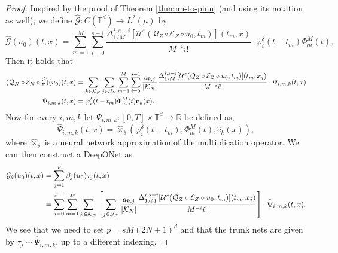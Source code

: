 \documentclass{article}
\numberwithin{equation}{section}
\newcommand{\fb}{\bm{\mathrm{e}}}
\newcommand{\T}{\mathbb{T}}
\newcommand{\R}{\mathbb{R}}
\newcommand{\cE}{\mathcal{E}}
\newcommand{\cG}{\mathcal{G}}
\newcommand{\cJ}{\mathcal{J}}
\newcommand{\cK}{\mathcal{K}}
\newcommand{\cQ}{\mathcal{Q}}
\newcommand{\cU}{\mathcal{U}}
\renewcommand{\epsilon}{\varepsilon}
\newcommand{\1}{\mathbbm{1}}
\newcommand{\Psihat}{\widehat{\Psi}}
\newcommand{\hattimes}{\widehat{\times}}
\newcommand{\cGhat}{{\widehat{\cG}}}
\begin{document}
\begin{proof}
Inspired by the proof of Theorem \ref{thm:nn-to-pinn} (and using its notation as well), we define $\cGhat: C(\T^d)\to L^2(\mu)$ by
\begin{equation}
    \cGhat(u_0)(t,x) =  \sum_{m=1}^M\sum_{i=0}^{s-1}  \frac{\Delta^{i,s-i}_{1/M}[\cU^\epsilon(\cQ_Z\circ\cE_Z\circ u_0, t_m)](t_m,x)}{M^{-i} i!}\cdot \varphi_i^\delta(t-t_m)   \Phi^M_m(t), 
\end{equation}
Then it holds that
\begin{equation}
\begin{split}
    (\cQ_N\circ\cE_N\circ\cGhat)(u_0)(t,x) &=  \sum_{k\in \cK_N} \sum_{j\in \cJ_N}  \sum_{m=1}^M\sum_{i=0}^{s-1} \frac{a_{k,j}}{\abs{\cK_N}} \frac{\Delta^{i,s-i}_{1/M}[\cU^\epsilon(\cQ_Z\circ\cE_Z\circ u_0, t_m)](t_m,x_j)}{M^{-i} i!}\cdot \Psi_{i,m,k}(t,x)\\
    \Psi_{i,m,k}(t,x) &= \varphi_i^\delta(t-t_m)   \Phi^M_m(t)  \fb_k(x).
\end{split}
\end{equation}
Now for every $i, m, k$ let $\Psi_{i,m,k}:[0,T]\times \T^d\to \R$ be defined as, 
\begin{equation}
    \Psihat_{i,m,k}(t,x) = \hattimes_\delta\left(\varphi_i^\delta(t-t_m),\Phi^M_m(t),\widehat{\fb}
    _k(x)\right), 
\end{equation}
where $\hattimes_\delta$ is a neural network approximation of the multiplication operator. We can then construct a DeepONet as
\begin{equation}\label{eq:def-pido}
    \begin{split}
 \cG_\theta(u_0)(t,x) &= \sum_{j=1}^p \beta_j(u_0)\tau_j(t,x)\\
 &= \sum_{i=0}^{s-1}\sum_{m=1}^M \sum_{k\in \cK_N} \left[\sum_{j\in \cJ_N}   \frac{a_{k,j}}{\abs{\cK_N}} \frac{\Delta^{i,s-i}_{1/M}[\cU^\epsilon(\cQ_Z\circ\cE_Z\circ u_0, t_m)](t_m,x_j)}{M^{-i} i!}\right] \cdot \Psihat_{i,m,k}(t,x).
    \end{split}
\end{equation}
We see that we need to set $p=sM(2N+1)^d$ and that the trunk nets are given by $\tau_j\sim \Psihat_{i,m,k}$, up to a different indexing. 


\end{proof}
\end{document}
